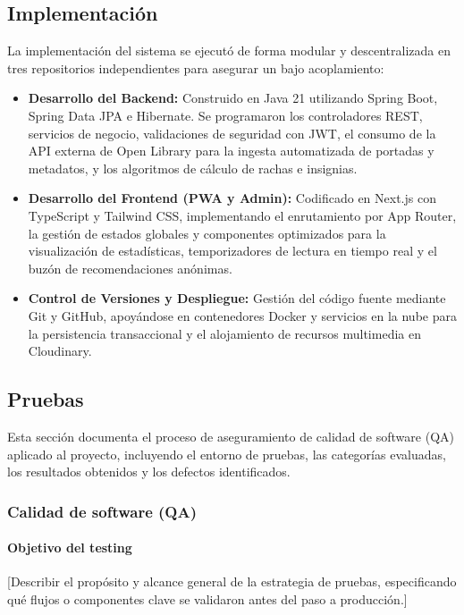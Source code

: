 \documentclass[12pt, atypical, journal]{article}
\begin{document}
\subsection{Implementación}
La implementación del sistema se ejecutó de forma modular y descentralizada en tres repositorios independientes para asegurar un bajo acoplamiento:
\begin{itemize}
    \item \textbf{Desarrollo del Backend:} Construido en Java 21 utilizando Spring Boot, Spring Data JPA e Hibernate. Se programaron los controladores REST, servicios de negocio, validaciones de seguridad con JWT, el consumo de la API externa de Open Library para la ingesta automatizada de portadas y metadatos, y los algoritmos de cálculo de rachas e insignias.
    \item \textbf{Desarrollo del Frontend (PWA y Admin):} Codificado en Next.js con TypeScript y Tailwind CSS, implementando el enrutamiento por App Router, la gestión de estados globales y componentes optimizados para la visualización de estadísticas, temporizadores de lectura en tiempo real y el buzón de recomendaciones anónimas.
    \item \textbf{Control de Versiones y Despliegue:} Gestión del código fuente mediante Git y GitHub, apoyándose en contenedores Docker y servicios en la nube para la persistencia transaccional y el alojamiento de recursos multimedia en Cloudinary.
\end{itemize}

\subsection{Pruebas}
Esta sección documenta el proceso de aseguramiento de calidad de software (QA) aplicado al proyecto, incluyendo el entorno de pruebas, las categorías evaluadas, los resultados obtenidos y los defectos identificados.

\subsubsection{Calidad de software (QA)}

\paragraph{Objetivo del testing}
[Describir el propósito y alcance general de la estrategia de pruebas, especificando qué flujos o componentes clave se validaron antes del paso a producción.]
\end{document}
